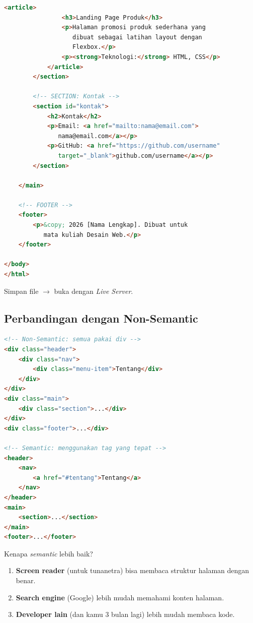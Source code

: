 \begin{lstlisting}[language=HTML, caption={Halaman profil dengan semantic HTML}, label={lst:m03-profil}]
            <article>
                <h3>Landing Page Produk</h3>
                <p>Halaman promosi produk sederhana yang
                   dibuat sebagai latihan layout dengan
                   Flexbox.</p>
                <p><strong>Teknologi:</strong> HTML, CSS</p>
            </article>
        </section>

        <!-- SECTION: Kontak -->
        <section id="kontak">
            <h2>Kontak</h2>
            <p>Email: <a href="mailto:nama@email.com">
               nama@email.com</a></p>
            <p>GitHub: <a href="https://github.com/username"
               target="_blank">github.com/username</a></p>
        </section>

    </main>

    <!-- FOOTER -->
    <footer>
        <p>&copy; 2026 [Nama Lengkap]. Dibuat untuk
           mata kuliah Desain Web.</p>
    </footer>

</body>
</html>
\end{lstlisting}

Simpan file $\rightarrow$ buka dengan \emph{Live Server}.

\subsection{Perbandingan dengan Non-Semantic}

\begin{lstlisting}[language=HTML, caption={Perbandingan non-semantic vs semantic}, label={lst:m03-perbandingan}]
<!-- Non-Semantic: semua pakai div -->
<div class="header">
    <div class="nav">
        <div class="menu-item">Tentang</div>
    </div>
</div>
<div class="main">
    <div class="section">...</div>
</div>
<div class="footer">...</div>

<!-- Semantic: menggunakan tag yang tepat -->
<header>
    <nav>
        <a href="#tentang">Tentang</a>
    </nav>
</header>
<main>
    <section>...</section>
</main>
<footer>...</footer>
\end{lstlisting}

\begin{catatan}
Kenapa \emph{semantic} lebih baik?
\begin{enumerate}
  \item \textbf{Screen reader} (untuk tunanetra) bisa membaca struktur halaman dengan benar.
  \item \textbf{Search engine} (Google) lebih mudah memahami konten halaman.
  \item \textbf{Developer lain} (dan kamu 3 bulan lagi) lebih mudah membaca kode.
\end{enumerate}
\end{catatan}

